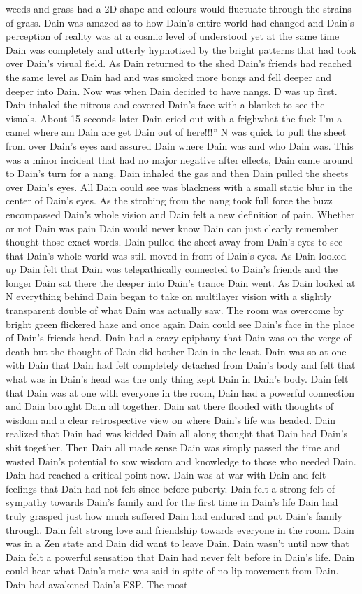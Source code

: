 \documentclass[12pt]{book}
\begin{document}
weeds and grass had a 2D shape and colours would fluctuate through the strains of grass. Dain was amazed as to how Dain's entire world had changed and Dain's perception of reality was at a cosmic level of understood yet at the same time Dain was completely and utterly hypnotized by the bright patterns that had took over Dain's visual field. As Dain returned to the shed Dain's friends had reached the same level as Dain had and was smoked more bongs and fell deeper and deeper into Dain. Now was when Dain decided to have nangs. D was up first. Dain inhaled the nitrous and covered Dain's face with a blanket to see the visuals. About 15 seconds later Dain cried out with a frighwhat the fuck I'm a camel where am Dain are get Dain out of here!!!'' N was quick to pull the sheet from over Dain's eyes and assured Dain where Dain was and who Dain was. This was a minor incident that had no major negative after effects, Dain came around to Dain's turn for a nang. Dain inhaled the gas and then Dain pulled the sheets over Dain's eyes. All Dain could see was blackness with a small static blur in the center of Dain's eyes. As the strobing from the nang took full force the buzz encompassed Dain's whole vision and Dain felt a new definition of pain. Whether or not Dain was pain Dain would never know Dain can just clearly remember thought those exact words. Dain pulled the sheet away from Dain's eyes to see that Dain's whole world was still moved in front of Dain's eyes. As Dain looked up Dain felt that Dain was telepathically connected to Dain's friends and the longer Dain sat there the deeper into Dain's trance Dain went. As Dain looked at N everything behind Dain began to take on multilayer vision with a slightly transparent double of what Dain was actually saw. The room was overcome by bright green flickered haze and once again Dain could see Dain's face in the place of Dain's friends head. Dain had a crazy epiphany that Dain was on the verge of death but the thought of Dain did bother Dain in the least. Dain was so at one with Dain that Dain had felt completely detached from Dain's body and felt that what was in Dain's head was the only thing kept Dain in Dain's body. Dain felt that Dain was at one with everyone in the room, Dain had a powerful connection and Dain brought Dain all together. Dain sat there flooded with thoughts of wisdom and a clear retrospective view on where Dain's life was headed. Dain realized that Dain had was kidded Dain all along thought that Dain had Dain's shit together. Then Dain all made sense Dain was simply passed the time and wasted Dain's potential to sow wisdom and knowledge to those who needed Dain. Dain had reached a critical point now. Dain was at war with Dain and felt feelings that Dain had not felt since before puberty. Dain felt a strong felt of sympathy towards Dain's family and for the first time in Dain's life Dain had truly grasped just how much suffered Dain had endured and put Dain's family through. Dain felt strong love and friendship towards everyone in the room. Dain was in a Zen state and Dain did want to leave Dain. Dain wasn't until now that Dain felt a powerful sensation that Dain had never felt before in Dain's life. Dain could hear what Dain's mate was said in spite of no lip movement from Dain. Dain had awakened Dain's ESP. The most 
\end{document}
